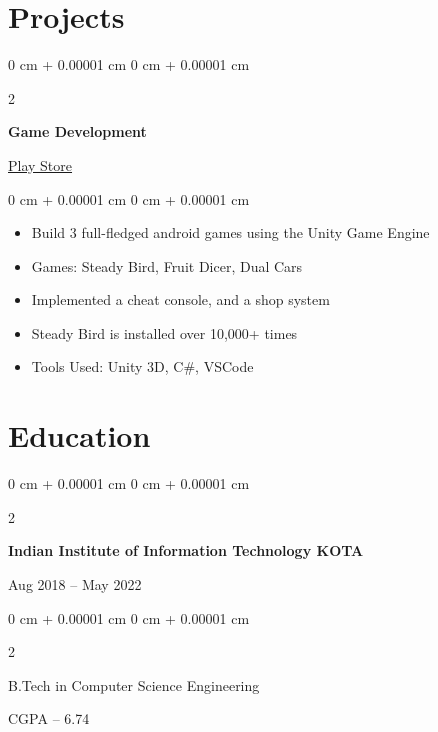 \documentclass[11pt, a4paper]{article}
\newenvironment{highlights}{
    \begin{itemize}[
        topsep=0.10 cm,
        parsep=0.10 cm,
        partopsep=0pt,
        itemsep=0pt,
        leftmargin=0 cm + 10pt
    ]
}{
    \end{itemize}
} %
\newenvironment{onecolentry}{
    \begin{adjustwidth}{
        0 cm + 0.00001 cm
    }{
        0 cm + 0.00001 cm
    }
}{
    \end{adjustwidth}
} %
\newenvironment{twocolentry}[2][]{
    \onecolentry
    \def\secondColumn{#2}
    \setcolumnwidth{\fill, 4.5 cm}
    \begin{paracol}{2}
}{
    \switchcolumn \raggedleft \secondColumn
    \end{paracol}
    \endonecolentry
} %
\begin{document}
    \section{Projects}
        \begin{twocolentry}{\href{https://play.google.com/store/apps/dev?id=5970738356311592163}{Play Store\hspace{0.15 cm}\faLink}}
            \textbf{Game Development}
        \end{twocolentry}
        \vspace{0.1 cm}

        \begin{onecolentry}
            \begin{highlights}
                \item Build 3 full-fledged android games using the Unity Game Engine
                \item Games: Steady Bird, Fruit Dicer, Dual Cars
                \item Implemented a cheat console, and a shop system
                \item Steady Bird is installed over 10,000+ times
                \item Tools Used: Unity 3D, C\#, VSCode
            \end{highlights}
        \end{onecolentry}



    \section{Education}
        \begin{twocolentry}{Aug 2018 – May 2022}
            \textbf{Indian Institute of Information Technology KOTA}
        \end{twocolentry}
        \vspace{0.1 cm}

        \begin{twocolentry}{CGPA – 6.74}
            B.Tech in Computer Science Engineering
        \end{twocolentry}
\end{document}
